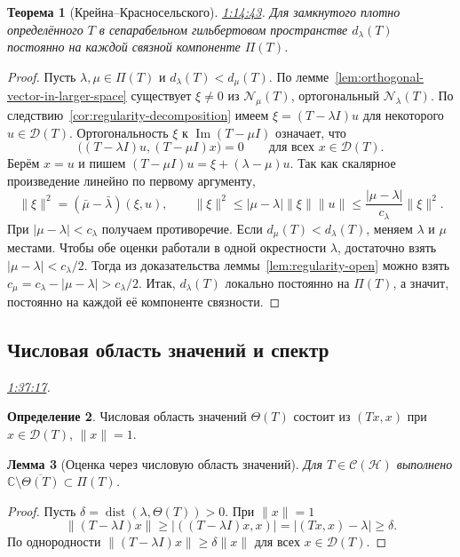\documentclass[11pt,a4paper]{article}
\theoremstyle{plain}
\newtheorem{theorem}{Теорема}[section]
\newtheorem{lemma}[theorem]{Лемма}
\theoremstyle{definition}
\newtheorem{definition}[theorem]{Определение}
\newcommand{\CC}{\mathbb C}
\newcommand{\Hh}{\mathcal H}
\newcommand{\Dom}{\mathcal D}
\newcommand{\id}{I}
\newcommand{\abs}[1]{\lvert#1\rvert}
\newcommand{\norm}[1]{\lVert#1\rVert}
\DeclareMathOperator{\dist}{dist}
\newcommand{\at}[3]{\href{https://www.youtube.com/watch?v=#1&t=#2s}{#3}}
\newcommand{\topic}[2]{\Needspace{5\baselineskip}\subsection*{#1}\noindent\emph{#2.}\par\nobreak\smallskip}
\begin{document}
\begin{theorem}[Крейна--Красносельского]
\label{thm:krein-krasnoselskii}
\at{dRCTK4VqBTk}{4483}{1:14:43}.
Для замкнутого плотно определённого $T$ в сепарабельном
гильбертовом пространстве $d_\lambda(T)$ постоянно на
каждой связной компоненте $\Pi(T)$.
\end{theorem}
\begin{proof}
Пусть $\lambda,\mu\in\Pi(T)$ и $d_\lambda(T)<d_\mu(T)$.
По лемме~\ref{lem:orthogonal-vector-in-larger-space} существует
$\xi\ne0$ из $\mathcal N_\mu(T)$, ортогональный
$\mathcal N_\lambda(T)$. По следствию~\ref{cor:regularity-decomposition}
имеем $\xi=(T-\lambda\id)u$ для некоторого $u\in\Dom(T)$.
Ортогональность $\xi$ к $\operatorname{Im}(T-\mu\id)$ означает, что
\[
 \bigl((T-\lambda\id)u,(T-\mu\id)x\bigr)=0
 \qquad\text{для всех } x\in\Dom(T).
\]
Берём $x=u$ и пишем $(T-\mu\id)u=\xi+(\lambda-\mu)u$.
Так как скалярное произведение линейно по первому аргументу,
\[
 \norm\xi^2=(\bar\mu-\bar\lambda)(\xi,u),\qquad
 \norm\xi^2\le\abs{\mu-\lambda}\norm\xi\norm u
     \le\frac{\abs{\mu-\lambda}}{c_\lambda}\norm\xi^2 .
\]
При $\abs{\mu-\lambda}<c_\lambda$ получаем противоречие.
Если $d_\mu(T)<d_\lambda(T)$, меняем $\lambda$ и $\mu$ местами.
Чтобы обе оценки работали в одной окрестности $\lambda$, достаточно
взять $\abs{\mu-\lambda}<c_\lambda/2$. Тогда из доказательства
леммы~\ref{lem:regularity-open} можно взять
$c_\mu=c_\lambda-\abs{\mu-\lambda}>c_\lambda/2$.
Итак, $d_\lambda(T)$ локально постоянно на $\Pi(T)$, а значит,
постоянно на каждой её компоненте связности.
\end{proof}

\topic{Числовая область значений и спектр}{\at{dRCTK4VqBTk}{5837}{1:37:17}}
\begin{definition}
Числовая область значений $\Theta(T)$ состоит из $(Tx,x)$
при $x\in\Dom(T)$, $\norm x=1$.
\end{definition}
\begin{lemma}[Оценка через числовую область значений]
\label{lem:numerical-range-regularity}
Для $T\in\mathcal C(\Hh)$ выполнено
$\CC\setminus\overline{\Theta(T)}\subset\Pi(T)$.
\end{lemma}
\begin{proof}
Пусть $\delta=\dist(\lambda,\Theta(T))>0$. При $\norm x=1$
\[
 \norm{(T-\lambda\id)x}\ge\abs{((T-\lambda\id)x,x)}
     =\abs{(Tx,x)-\lambda}\ge\delta .
\]
По однородности $\norm{(T-\lambda\id)x}\ge\delta\norm x$
для всех $x\in\Dom(T)$.
\end{proof}
\end{document}
